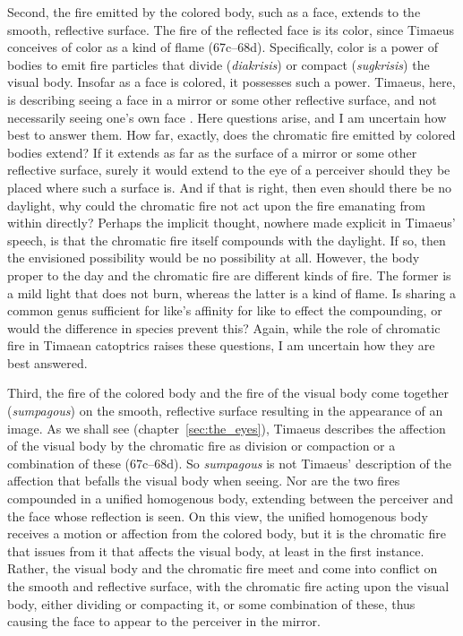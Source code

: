 Second, the fire emitted by the colored body, such as a face, extends to the smooth, reflective surface. The fire of the reflected face is its color, since Timaeus conceives of color as a kind of flame (67c–68d). Specifically, color is a power of bodies to emit fire particles that divide (\emph{diakrisis}) or compact (\emph{sugkrisis}) the visual body. Insofar as a face is colored, it possesses such a power. Timaeus, here, is describing seeing a face in a mirror or some other reflective surface, and not necessarily seeing one's own face \citep[286--7]{Taylor:1928qb}. Here questions arise, and I am uncertain how best to answer them. How far, exactly, does the chromatic fire emitted by colored bodies extend? If it extends as far as the surface of a mirror or some other reflective surface, surely it would extend to the eye of a perceiver should they be placed where such a surface is. And if that is right, then even should there be no daylight, why could the chromatic fire not act upon the fire emanating from within directly? Perhaps the implicit thought, nowhere made explicit in Timaeus' speech, is that the chromatic fire itself compounds with the daylight. If so, then the envisioned possibility would be no possibility at all. However, the body proper to the day and the chromatic fire are different kinds of fire. The former is a mild light that does not burn, whereas the latter is a kind of flame. Is sharing a common genus sufficient for like's affinity for like to effect the compounding, or would the difference in species prevent this? Again, while the role of chromatic fire in Timaean catoptrics raises these questions, I am uncertain how they are best answered.

Third, the fire of the colored body and the fire of the visual body come together (\emph{sumpagous}) on the smooth, reflective surface resulting in the appearance of an image. As we shall see (chapter~\ref{sec:the_eyes}), Timaeus describes the affection of the visual body by the chromatic fire as division  or compaction or a combination of these (67c–68d). So \emph{sumpagous} is not Timaeus' description of the affection that befalls the visual body when seeing. Nor are the two fires compounded in a unified homogenous body, extending between the perceiver and the face whose reflection is seen. On this view, the unified homogenous body receives a motion or affection from the colored body, but it is the chromatic fire that issues from it that affects the visual body, at least in the first instance.  Rather, the visual body and the chromatic fire meet and come into conflict on the smooth and reflective surface, with the chromatic fire acting upon the visual body, either dividing or compacting it, or some combination of these, thus causing the face to appear to the perceiver in the mirror.


